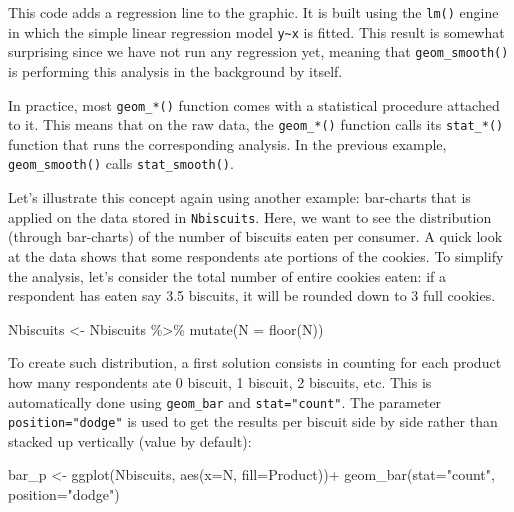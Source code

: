 \documentclass[
]{krantz}
\makeatletter
\newenvironment{Shaded}{\begin{snugshade}}{\end{snugshade}}
\newcommand{\AttributeTok}[1]{\textcolor[rgb]{0.61,0.61,0.61}{#1}}
\newcommand{\FunctionTok}[1]{\textcolor[rgb]{0,0,0}{#1}}
\newcommand{\NormalTok}[1]{#1}
\newcommand{\OtherTok}[1]{\textcolor[rgb]{0.37,0.37,0.37}{#1}}
\newcommand{\SpecialCharTok}[1]{\textcolor[rgb]{0,0,0}{#1}}
\newcommand{\StringTok}[1]{\textcolor[rgb]{0.5,0.5,0.5}{#1}}
\newenvironment{kframe}{%
\medskip{}
\setlength{\fboxsep}{.8em}
 \def\at@end@of@kframe{}%
 \ifinner\ifhmode%
  \def\at@end@of@kframe{\end{minipage}}%
  \begin{minipage}{\columnwidth}%
 \fi\fi%
 \def\FrameCommand##1{\hskip\@totalleftmargin \hskip-\fboxsep
 \colorbox{shadecolor}{##1}\hskip-\fboxsep
     \hskip-\linewidth \hskip-\@totalleftmargin \hskip\columnwidth}%
 \MakeFramed {\advance\hsize-\width
   \@totalleftmargin\z@ \linewidth\hsize
   \@setminipage}}%
 {\par\unskip\endMakeFramed%
 \at@end@of@kframe}
\renewenvironment{Shaded}{\begin{kframe}}{\end{kframe}}
\makeatother
\begin{document}
This code adds a regression line to the graphic. It is built using the \texttt{lm()} engine in which the simple linear regression model \texttt{y\textasciitilde{}x} is fitted. This result is somewhat surprising since we have not run any regression yet, meaning that \texttt{geom\_smooth()} is performing this analysis in the background by itself.

In practice, most \texttt{geom\_*()} function comes with a statistical procedure attached to it. This means that on the raw data, the \texttt{geom\_*()} function calls its \texttt{stat\_*()} function that runs the corresponding analysis. In the previous example, \texttt{geom\_smooth()} calls \texttt{stat\_smooth()}.

Let's illustrate this concept again using another example: bar-charts that is applied on the data stored in \texttt{Nbiscuits}.
Here, we want to see the distribution (through bar-charts) of the number of biscuits eaten per consumer. A quick look at the data shows that some respondents ate portions of the cookies. To simplify the analysis, let's consider the total number of entire cookies eaten: if a respondent has eaten say 3.5 biscuits, it will be rounded down to 3 full cookies.

\begin{Shaded}
\begin{Highlighting}[]
\NormalTok{Nbiscuits }\OtherTok{\textless{}{-}}\NormalTok{ Nbiscuits }\SpecialCharTok{\%\textgreater{}\%} 
  \FunctionTok{mutate}\NormalTok{(}\AttributeTok{N =} \FunctionTok{floor}\NormalTok{(N))}
\end{Highlighting}
\end{Shaded}

To create such distribution, a first solution consists in counting for each product how many respondents ate 0 biscuit, 1 biscuit, 2 biscuits, etc. This is automatically done using \texttt{geom\_bar} and \texttt{stat="count"}. The parameter \texttt{position="dodge"} is used to get the results per biscuit side by side rather than stacked up vertically (value by default):

\begin{Shaded}
\begin{Highlighting}[]
\NormalTok{bar\_p }\OtherTok{\textless{}{-}} \FunctionTok{ggplot}\NormalTok{(Nbiscuits, }\FunctionTok{aes}\NormalTok{(}\AttributeTok{x=}\NormalTok{N, }\AttributeTok{fill=}\NormalTok{Product))}\SpecialCharTok{+}
  \FunctionTok{geom\_bar}\NormalTok{(}\AttributeTok{stat=}\StringTok{"count"}\NormalTok{, }\AttributeTok{position=}\StringTok{"dodge"}\NormalTok{)}
\end{Highlighting}
\end{Shaded}
\end{document}
